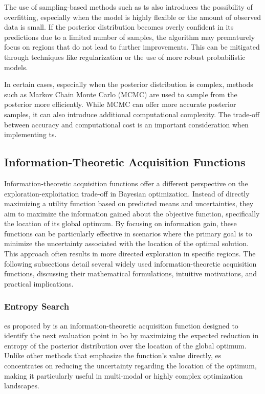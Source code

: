 The use of sampling-based methods such as \ac{ts} also introduces the possibility of overfitting, especially when the model is highly flexible or the amount of observed data is small. If the posterior distribution becomes overly confident in its predictions due to a limited number of samples, the algorithm may prematurely focus on regions that do not lead to further improvements. This can be mitigated through techniques like regularization or the use of more robust probabilistic models.

In certain cases, especially when the posterior distribution is complex, methods such as Markov Chain Monte Carlo (MCMC) are used to sample from the posterior more efficiently. While MCMC can offer more accurate posterior samples, it can also introduce additional computational complexity. The trade-off between accuracy and computational cost is an important consideration when implementing \acf{ts}.

\subsection{Information-Theoretic Acquisition Functions}
\label{section:information_theoretic_acquisition_functions}

Information-theoretic acquisition functions offer a different perspective on the exploration-exploitation trade-off in Bayesian optimization. Instead of directly maximizing a utility function based on predicted means and uncertainties, they aim to maximize the information gained about the objective function, specifically the location of its global optimum. By focusing on information gain, these functions can be particularly effective in scenarios where the primary goal is to minimize the uncertainty associated with the location of the optimal solution. This approach often results in more directed exploration in specific regions. The following subsections detail several widely used information-theoretic acquisition functions, discussing their mathematical formulations, intuitive motivations, and practical implications.

\subsubsection{Entropy Search}
\label{section:entropy_search}

\acf{es} proposed by \citet{hennig2012entropy} is an information-theoretic acquisition function designed to identify the next evaluation point in \ac{bo} by maximizing the expected reduction in entropy of the posterior distribution over the location of the global optimum. Unlike other methods that emphasize the function's value directly, \ac{es} concentrates on reducing the uncertainty regarding the location of the optimum, making it particularly useful in multi-modal or highly complex optimization landscapes.

